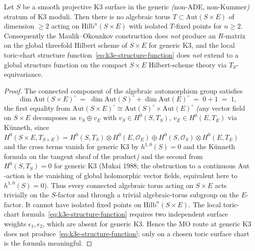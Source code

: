 \begin{lemma}
\label{lem:mo-bypass-local-to-global}
Let $S$ be a smooth projective K3 surface in the generic
\emph{(}non-ADE, non-Kummer\emph{)} stratum of K3 moduli. Then
there is no algebraic torus $T \subset \mathrm{Aut}(S \times E)$
of dimension $\geq 2$ acting on $\mathrm{Hilb}^n(S \times E)$ with
isolated $T$-fixed points for $n \geq 2$. Consequently the
Maulik--Okounkov construction does \emph{not} produce an
$R$-matrix on the global threefold Hilbert scheme of \(S \times E\) for generic K3,
and the local toric-chart structure function~\eqref{eq:k3e-structure-function}
does \emph{not} extend to a global structure function on
the compact \(S\times E\) Hilbert-scheme theory via $T_S$-equivariance.
\end{lemma}

\begin{proof}
The connected component of the algebraic automorphism group
satisfies
\[
 \dim \mathrm{Aut}(S \times E)^\circ
 \;=\; \dim \mathrm{Aut}(S)^\circ + \dim \mathrm{Aut}(E)^\circ
 \;=\; 0 + 1
 \;=\; 1,
\]
the first equality from
$\mathrm{Aut}(S \times E)^\circ \cong \mathrm{Aut}(S)^\circ
\times \mathrm{Aut}(E)^\circ$ \textit{(}any vector field on
$S \times E$ decomposes as $v_S \oplus v_E$ with
$v_S \in H^0(S, T_S)$, $v_E \in H^0(E, T_E)$ via K\"unneth,
since $H^0(S \times E, T_{S \times E}) = H^0(S, T_S) \otimes
H^0(E, \mathcal{O}_E) \oplus H^0(S, \mathcal{O}_S) \otimes
H^0(E, T_E)$ and the cross terms vanish for generic K3 by
$h^{1,0}(S) = 0$ and the K\"unneth formula on the tangent
sheaf of the product\textit{)} and the second
from $H^0(S, T_S) = 0$ for generic K3 (Mukai 1988; the obstruction
to a continuous $\mathrm{Aut}$-action is the vanishing of global
holomorphic vector fields, equivalent here to $h^{1,0}(S) = 0$).
Thus every connected algebraic torus acting on \(S\times E\) acts
trivially on the \(S\)-factor and through a trivial algebraic-torus
subgroup on the \(E\)-factor. It cannot have isolated fixed points on
\(\mathrm{Hilb}^n(S\times E)\). The local toric-chart
formula~\eqref{eq:k3e-structure-function} requires two independent
surface weights \(\epsilon_1,\epsilon_2\), which are absent for generic
K3. Hence the MO route at generic K3 does not
produce~\eqref{eq:k3e-structure-function}; only on a chosen toric
surface chart is the formula meaningful.
\end{proof}

